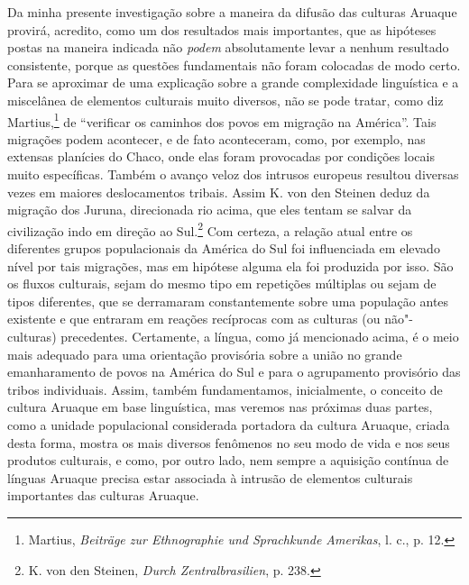 Da minha presente investigação sobre a maneira da difusão das culturas
Aruaque provirá, acredito, como um dos resultados mais importantes, que
as hipóteses postas na maneira indicada não \emph{podem} absolutamente
levar a nenhum resultado consistente, porque as questões fundamentais
não foram colocadas de modo certo. Para se aproximar de uma explicação
sobre a grande complexidade linguística e a miscelânea de elementos
culturais muito diversos, não se pode tratar, como diz Martius,\footnote{Martius,
  \emph{Beiträge zur Ethnographie und Sprachkunde Amerikas}, l. c., p.
  12.} de ``verificar os caminhos dos povos em migração na América''.
Tais migrações podem acontecer, e de fato aconteceram, como, por
exemplo, nas extensas planícies do Chaco, onde elas foram provocadas por
condições locais muito específicas. Também o avanço veloz dos intrusos
europeus resultou diversas vezes em maiores deslocamentos tribais.
Assim K. von den Steinen deduz da migração dos Juruna, direcionada rio
acima, que eles tentam se salvar da civilização indo em direção ao
Sul.\footnote{K. von den Steinen, \emph{Durch Zentralbrasilien}, p. 238.}
Com certeza, a relação atual entre os diferentes grupos populacionais da
América do Sul foi influenciada em elevado nível por tais migrações, mas
em hipótese alguma ela foi produzida por isso. São os fluxos culturais,
sejam do mesmo tipo em repetições múltiplas ou sejam de tipos
diferentes, que se derramaram constantemente sobre uma população antes
existente e que entraram em reações recíprocas com as culturas (ou
não"-culturas) precedentes. Certamente, a língua, como já mencionado
acima, é o meio mais adequado para uma orientação provisória sobre a
união no grande emanharamento de povos na América do Sul e para o
agrupamento provisório das tribos individuais. Assim, também
fundamentamos, inicialmente, o conceito de cultura Aruaque em base
linguística, mas veremos nas próximas duas partes, como a unidade
populacional considerada portadora da cultura Aruaque, criada desta
forma, mostra os mais diversos fenômenos no seu modo de vida e nos seus
produtos culturais, e como, por outro lado, nem sempre a aquisição
contínua de línguas Aruaque precisa estar associada à intrusão de
elementos culturais importantes das culturas Aruaque.

